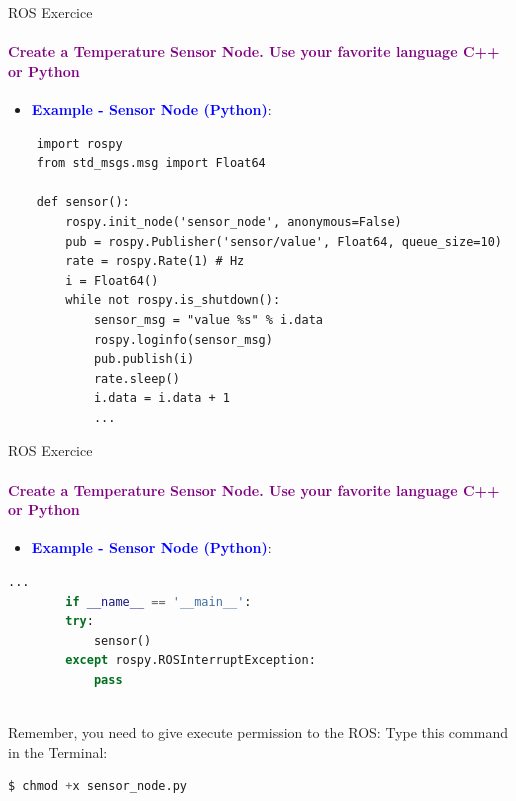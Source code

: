 \documentclass[aspectratio=169]{beamer}
\begin{document}
\begin{frame}[t,fragile]{ROS Exercice}
	\framesubtitle{\textcolor{purple}{Create a Temperature Sensor Node. Use your favorite language C++ or Python}}
	\begin{minipage}{0.6\textwidth}
		\begin{itemize}
			\item \textcolor{blue}{\textbf{Example - Sensor Node (Python)}}:
		\end{itemize}
	\begin{lstlisting}
	import rospy
	from std_msgs.msg import Float64

	def sensor():
		rospy.init_node('sensor_node', anonymous=False)
		pub = rospy.Publisher('sensor/value', Float64, queue_size=10)
		rate = rospy.Rate(1) # Hz
		i = Float64()
		while not rospy.is_shutdown():
			sensor_msg = "value %s" % i.data
			rospy.loginfo(sensor_msg)
			pub.publish(i)
			rate.sleep()
			i.data = i.data + 1
			...
    \end{lstlisting}
\end{minipage}
\begin{minipage}{0.4\textwidth}
	
\end{minipage}
\end{frame}


\begin{frame}[fragile]{ROS Exercice}
	\framesubtitle{\textcolor{purple}{Create a Temperature Sensor Node. Use your favorite language C++ or Python}}
	\begin{minipage}{0.6\textwidth}
	\begin{itemize}
		\item \textcolor{blue}{\textbf{Example - Sensor Node (Python)}}:
	\end{itemize}
	\begin{lstlisting}[language=Python]
		...
		if __name__ == '__main__':
		try:
			sensor()
		except rospy.ROSInterruptException:
			pass
	
    \end{lstlisting}
	\begin{block}{Remember, you need to give execute permission to the ROS:}
		Type this command in the Terminal:
		\begin{lstlisting}[language=Python]
		$ chmod +x sensor_node.py
		\end{lstlisting}
	\end{block}
\end{minipage}
\begin{minipage}{0.4\textwidth}
	
\end{minipage}
\end{frame}
\end{document}
